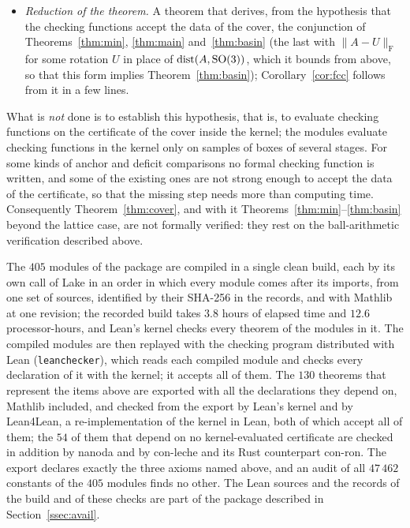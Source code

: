 \begin{itemize}
if the function accepts a box with its data, then the box is discharged. These functions were written for the formalization; several
of them use bounds different from those of Section~\ref{sec:cover}.
\item \emph{Reduction of the theorem.} A theorem that derives, from the hypothesis that the checking functions accept the data of
the cover, the conjunction of Theorems~\ref{thm:min}, \ref{thm:main} and~\ref{thm:basin} (the last with $\|A-U\|_{\mathrm F}$ for some
rotation $U$ in place of $\operatorname{dist}(A,\mathrm{SO}(3))$, which it bounds from above, so that this form implies Theorem~\ref{thm:basin});
Corollary~\ref{cor:fcc} follows from it in a few lines.
\end{itemize}
What is \emph{not} done is to establish this hypothesis, that is, to evaluate checking functions on the certificate of the cover
inside the kernel; the modules evaluate checking functions in the kernel only on samples of boxes of several stages. For
some kinds of anchor and deficit comparisons no formal checking function is written, and some of the existing ones are not
strong enough to accept the data of the certificate, so that the missing step needs more than computing time. Consequently Theorem~\ref{thm:cover}, and with it Theorems~\ref{thm:min}--\ref{thm:basin} beyond the
lattice case, are not formally verified: they rest on the ball-arithmetic verification described above.

The $405$ modules of the package are compiled in a single clean build, each by its own call of Lake in an order in which every
module comes after its imports, from one set of sources, identified by their SHA-256 in the records, and with Mathlib at one
revision; the recorded build takes
$3.8$ hours of elapsed time and $12.6$ processor-hours, and Lean's kernel checks every theorem of the modules in it. The
compiled modules are then replayed with the checking program distributed with Lean (\texttt{leanchecker}), which reads each
compiled module and checks every declaration of it with the kernel; it accepts all of them. The $130$ theorems that represent
the items above are exported with all the declarations they depend on, Mathlib included, and checked from the export by
Lean's kernel and by Lean4Lean, a re-implementation of the kernel in Lean, both of which accept all of them; the $54$ of them
that depend on no kernel-evaluated certificate are checked in addition by nanoda and by con-leche and its Rust counterpart
con-ron. The export declares exactly the three axioms named above, and an audit of all $47\,462$ constants of the $405$
modules finds no other. The Lean sources and the records of the build and of these checks are part of the package described
in Section~\ref{ssec:avail}.

